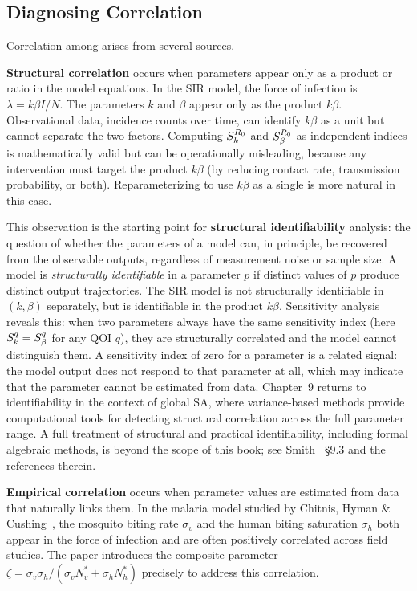 \subsection{Diagnosing Correlation}

Correlation among \POIs arises from several sources.

\textbf{Structural correlation} occurs when parameters appear
only as a product or ratio in the model equations.
In the SIR model, the force of infection is
$\lambda = k\beta I/N$.
The parameters $k$ and $\beta$ appear only as the product $k\beta$.
Observational data, incidence counts over time, can identify
$k\beta$ as a unit but cannot separate the two factors.
Computing $S_{k}^{R_0}$ and $S_{\beta}^{R_0}$ as independent indices
is mathematically valid but can be operationally misleading,
because any intervention must target the product $k\beta$
(by reducing contact rate, transmission probability, or both).
Reparameterizing to use $k\beta$ as a single \POI is more
natural in this case.

This observation is the starting point for \textbf{structural identifiability}%
\label{sec:structural_identifiability}%
analysis: the question of whether the parameters of a model can, in
principle, be recovered from the observable outputs, regardless of
measurement noise or sample size.
A model is \emph{structurally identifiable} in a parameter $p$ if distinct
values of $p$ produce distinct output trajectories.
The SIR model is not structurally identifiable in $(k, \beta)$ separately,
but is identifiable in the product $k\beta$.
Sensitivity analysis reveals this: when two parameters always have the
same sensitivity index (here $S_{k}^{q} = S_{\beta}^{q}$ for any QOI $q$),
they are structurally correlated and the model cannot distinguish them.
A sensitivity index of zero for a parameter is a related signal: the
model output does not respond to that parameter at all, which may indicate
that the parameter cannot be estimated from data.
Chapter~9 returns to identifiability in the context of global SA,
where variance-based methods provide computational tools for
detecting structural correlation across the full parameter range.
A full treatment of structural and practical identifiability, including
formal algebraic methods, is beyond the scope of this book;
see Smith~\cite{smith2014uncertainty} \S9.3 and the references therein.

\textbf{Empirical correlation} occurs when parameter values
are estimated from data that naturally links them.
In the malaria model studied by Chitnis, Hyman \& Cushing~\cite{chitnis2008determining},
the mosquito biting rate $\sigma_v$ and the human biting saturation
$\sigma_h$ both appear in the force of infection and are often
positively correlated across field studies.
The paper introduces the composite parameter
$\zeta = \sigma_v\sigma_h/(\sigma_v N_v^* + \sigma_h N_h^*)$
precisely to address this correlation.

